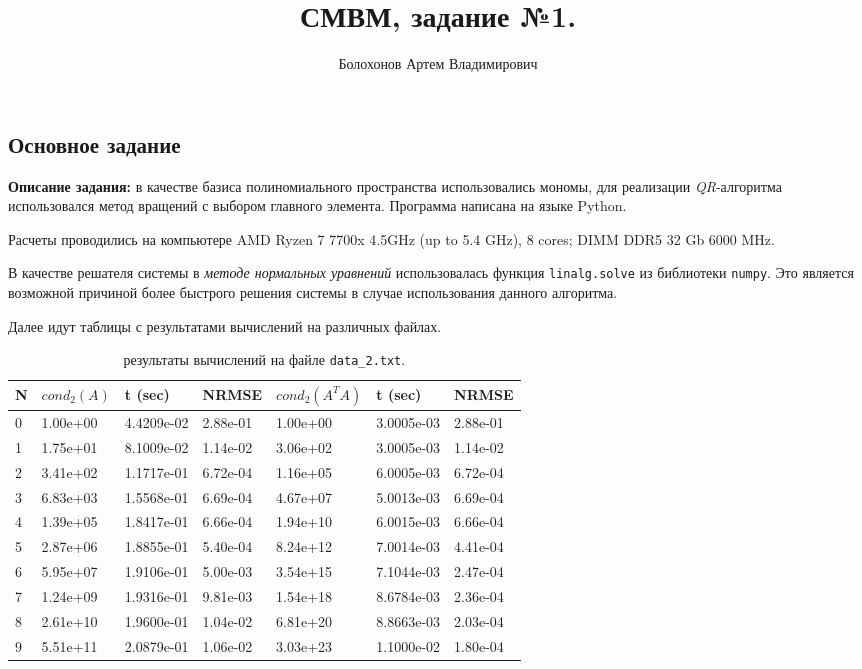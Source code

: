 \documentclass{article}
\title{СМВМ, задание №1.}
\author{Болохонов Артем Владимирович}
\begin{document}
\date{}
\maketitle

\begin{center}
    {\section*{Основное задание}}
\end{center}


\textbf{Описание задания:} в качестве базиса полиномиального пространства использовались мономы, для реализации \textit{QR}-алгоритма использовался метод вращений с
выбором главного элемента. Программа написана на языке Python.


Расчеты проводились на компьютере AMD Ryzen 7 7700x 4.5GHz (up to 5.4 GHz), 8 cores; DIMM DDR5 32 Gb 6000 MHz.


В качестве решателя системы в \textit{методе нормальных уравнений} использовалась функция \texttt{linalg.solve} из библиотеки \texttt{numpy}. Это является возможной причиной более быстрого решения системы в случае использования данного алгоритма.

Далее идут таблицы с результатами вычислений на различных файлах.

\begin{table}[h!]
\begin{tabular}{|l||l|l|l||l|l|l|}
\hline
N & $cond_2(A)$ & t (sec)    & NRMSE    & $cond_2(A^TA)$ & t (sec)    & NRMSE    \\ \hline
0 & 1.00e+00   & 4.4209e-02 & 2.88e-01 & 1.00e+00                       & 3.0005e-03 & 2.88e-01 \\ \hline
1 & 1.75e+01   & 8.1009e-02 & 1.14e-02 & 3.06e+02                       & 3.0005e-03 & 1.14e-02 \\ \hline
2 & 3.41e+02   & 1.1717e-01 & 6.72e-04 & 1.16e+05                       & 6.0005e-03 & 6.72e-04 \\ \hline
3 & 6.83e+03   & 1.5568e-01 & 6.69e-04 & 4.67e+07                       & 5.0013e-03 & 6.69e-04 \\ \hline
4 & 1.39e+05   & 1.8417e-01 & 6.66e-04 & 1.94e+10                       & 6.0015e-03 & 6.66e-04 \\ \hline
5 & 2.87e+06   & 1.8855e-01 & 5.40e-04 & 8.24e+12                       & 7.0014e-03 & 4.41e-04 \\ \hline
6 & 5.95e+07   & 1.9106e-01 & 5.00e-03 & 3.54e+15                       & 7.1044e-03 & 2.47e-04 \\ \hline
7 & 1.24e+09   & 1.9316e-01 & 9.81e-03 & 1.54e+18                       & 8.6784e-03 & 2.36e-04 \\ \hline
8 & 2.61e+10   & 1.9600e-01 & 1.04e-02 & 6.81e+20                       & 8.8663e-03 & 2.03e-04 \\ \hline
9 & 5.51e+11   & 2.0879e-01 & 1.06e-02 & 3.03e+23                       & 1.1000e-02 & 1.80e-04 \\ \hline
\end{tabular}
\caption{результаты вычислений на файле \texttt{data\_2.txt}.}
\end{table}
\end{document}
